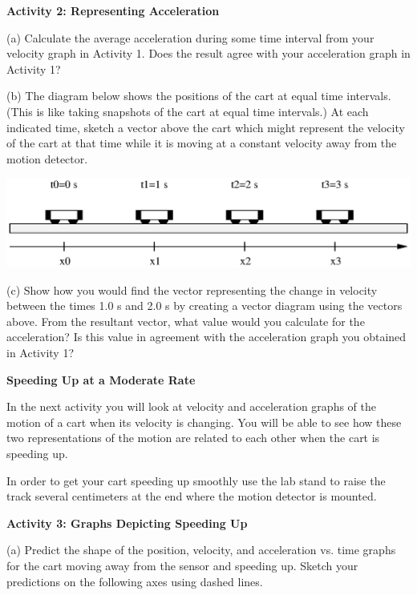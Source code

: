 \textbf{Activity 2: Representing Acceleration} 

(a) Calculate the average acceleration during some time interval from your velocity graph in Activity 1.  Does the result agree with your acceleration graph in Activity 1?
\vspace{20mm}

(b) The diagram below shows the positions of the cart at equal time intervals.
(This is like taking snapshots of the cart at equal time intervals.) At each
indicated time, sketch a vector above the cart which might represent the velocity
of the cart at that time while it is moving at a constant velocity away from
the motion detector.

\vspace{0.3cm}
{\par\centering \includegraphics{changing_fig3.eps} \par}
\vspace{0.3cm}

(c) Show how you would find the vector representing the change in velocity
between the times 1.0 s and 2.0 s by creating a vector diagram using the 
vectors above. From the resultant vector, what value would you calculate for 
the acceleration? Is this value in agreement
with the acceleration graph you obtained in Activity 1?
\vspace{20mm}

\textbf{Speeding Up at a Moderate Rate} 

In the next activity you will look at velocity and acceleration graphs of the
motion of a cart when its velocity is changing. You will be able to see how
these two representations of the motion are related to each other when the cart
is speeding up.

In order to get your cart speeding up smoothly use the lab stand to raise the
track several centimeters at the end where the motion detector is mounted.

\textbf{Activity 3: Graphs Depicting Speeding Up} 

(a) Predict the shape of the position, velocity, and acceleration vs. time graphs
for the cart moving away from the sensor and speeding up. Sketch your predictions
on the following axes using dashed lines.

